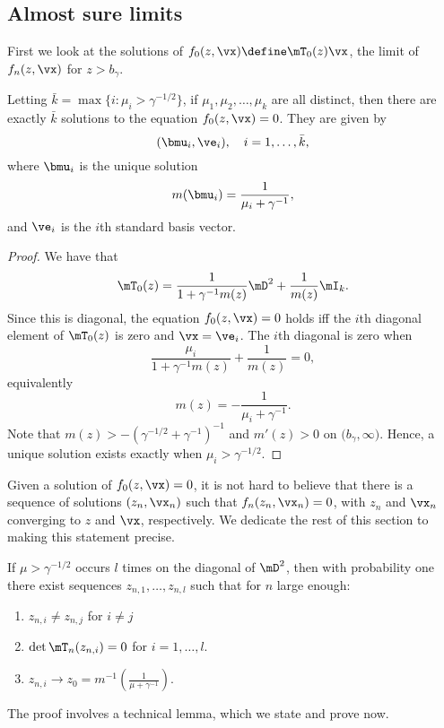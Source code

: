 \subsection{Almost sure limits}

First we look at the solutions of $f_0(z, \vx) \define \mT_0(z) \vx$, the limit of $f_n(z, \vx)$ for $z > b_\gamma$.  

\begin{lemma}
    Letting $\bar k = \max \{ i : \mu_i > \gamma^{-1/2} \}$, if $\mu_1, \mu_2, 
    \ldots, \mu_k$ are all distinct, then there are exactly
    $\bar k$ solutions to the equation $f_0( z, \vx ) = 0$.  They are given
    by
    \[
        ( \bmu_i, \ve_i ), \quad \text{$i = 1, \ldots, \bar k$},
    \]
    where $\bmu_i$ is the unique solution
    \[
        m( \bmu_i ) = \frac{1}{\mu_i + \gamma^{-1}},
    \]
    and $\ve_i$ is the $i$th standard basis vector.
\end{lemma}
\begin{proof}
    We have that 
    \[
        \mT_0(z) 
        = 
        \frac{1}{1 + \gamma^{-1} m(z)} \mD^2 
        + 
        \frac{1}{m(z)} \mI_k.
    \]
    Since this is diagonal, the equation $f_0(z, \vx) = 0$ holds iff the 
    $i$th diagonal element of $\mT_0(z)$ is zero and $\vx = \ve_i$.  The 
    $i$th diagonal is zero when 
    \[
        \frac{\mu_i}{1 + \gamma^{-1} m(z)} + \frac{1}{m(z)} = 0,
    \]
    equivalently
    \[
        m(z) = - \frac{1}{\mu_i + \gamma^{-1}}.
    \]
    Note that $m(z) > - \left( \gamma^{-1/2} + \gamma^{-1} \right)^{-1}$ and
    $m'(z) > 0$ on $\big( b_\gamma, \infty \big)$.  Hence, a unique solution
    exists exactly when $\mu_i > \gamma^{-1/2}$.
\end{proof}

Given a solution of $f_0(z, \vx) = 0$, it is not hard to believe that there is a sequence of solutions $(z_n, \vx_n)$ such that $f_n(z_n, \vx_n) = 0$, with $z_n$ and $\vx_n$ converging to $z$ and $\vx$, respectively.  We dedicate the rest of this section to making this statement precise.  

\begin{lemma}\label{L:zn-sequence-exists}
    If $\mu > \gamma^{-1/2}$ occurs $l$ times on the diagonal of $\mD^2$, then
    with probability one there exist sequences $z_{n,1}, 
    \ldots, z_{n,l}$ such that for $n$ large enough:
    \begin{enumerate}
        \item $z_{n,i} \neq z_{n,j}$ for $i \neq j$
        \item $\det \mT_n(z_{n,i}) = 0$ for $i = 1, \ldots, l$.
        \item $z_{n,i} \to 
                z_0 
                = 
                m^{-1} \left( \frac{1}{\mu + \gamma^{-1}} \right)$.
    \end{enumerate}
\end{lemma}
\noindent
The proof involves a technical lemma, which we state and prove now.

